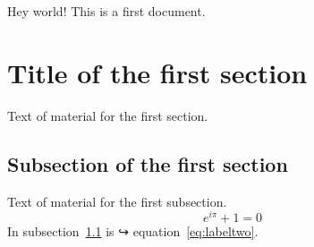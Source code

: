 \documentclass{article}
\begin{document}
Hey world!
This is a first document.
\section{Title of the first section}
Text of material for the first section.
\subsection{Subsection of the first section}
\label{subsec:labelone}
Text of material for the first subsection.
\begin{equation}
e^{i\pi}+1 = 0
\label{eq:labeltwo}
\end{equation}
In subsection~\ref{subsec:labelone} is
↪ equation~\ref{eq:labeltwo}.
\end{document}
